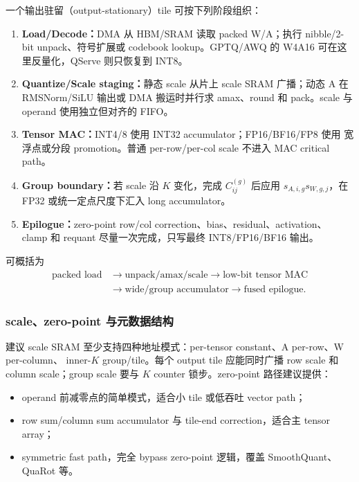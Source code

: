 一个输出驻留（output-stationary）tile 可按下列阶段组织：
\begin{enumerate}
  \item \textbf{Load/Decode：}DMA 从 HBM/SRAM 读取 packed W/A；执行 nibble/2-bit
  unpack、符号扩展或 codebook lookup。GPTQ/AWQ 的 W4A16 可在这里反量化，QServe
  则只恢复到 INT8。
  \item \textbf{Quantize/Scale staging：}静态 scale 从片上 scale SRAM 广播；动态 A
  在 RMSNorm/SiLU 输出或 DMA 搬运时并行求 amax、round 和 pack。scale 与 operand
  使用独立但对齐的 FIFO。
  \item \textbf{Tensor MAC：}INT4/8 使用 INT32 accumulator；FP16/BF16/FP8 使用
  宽浮点或分段 promotion。普通 per-row/per-col scale 不进入 MAC critical path。
  \item \textbf{Group boundary：}若 scale 沿 $K$ 变化，完成 $C_{ij}^{(g)}$ 后应用
  $s_{A,i,g}s_{W,g,j}$，在 FP32 或统一定点尺度下汇入 long accumulator。
  \item \textbf{Epilogue：}zero-point row/col correction、bias、residual、activation、
  clamp 和 requant 尽量一次完成，只写最终 INT8/FP16/BF16 输出。
\end{enumerate}

可概括为
\begin{equation}
  \begin{aligned}
    \boxed{\text{packed load}}
    &\rightarrow\boxed{\text{unpack/amax/scale}}
    \rightarrow\boxed{\text{low-bit tensor MAC}}\\
    &\rightarrow\boxed{\text{wide/group accumulator}}
    \rightarrow\boxed{\text{fused epilogue}}.
  \end{aligned}
  \label{eq:recommended-npu-pipeline}
\end{equation}

\subsubsection{scale、zero-point 与元数据结构}

建议 scale SRAM 至少支持四种地址模式：per-tensor constant、A per-row、W per-column、
inner-$K$ group/tile。每个 output tile 应能同时广播 row scale 和 column scale；group
scale 要与 $K$ counter 锁步。zero-point 路径建议提供：
\begin{itemize}
  \item operand 前减零点的简单模式，适合小 tile 或低吞吐 vector path；
  \item row sum/column sum accumulator 与 tile-end correction，适合主 tensor array；
  \item symmetric fast path，完全 bypass zero-point 逻辑，覆盖 SmoothQuant、QuaRot 等。
\end{itemize}

